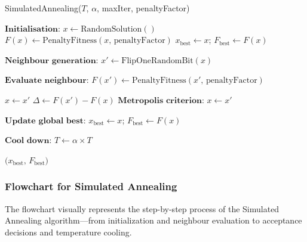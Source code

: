 \documentclass[12pt]{article}
\begin{document}
\begin{algorithm}[htbp]
  \caption{SimulatedAnnealing(\(T\), \(\alpha\), maxIter, penaltyFactor)}
  \label{alg:simulated_annealing}
  \begin{algorithmic}[1]
    \State \(\textbf{Initialisation:}\)
    \State \(x \gets \text{RandomSolution}()\) 
    \State \(F(x) \gets \text{PenaltyFitness}(x,\, \text{penaltyFactor})\) 
    \State \(x_{\text{best}} \gets x\); \quad \(F_{\text{best}} \gets F(x)\)

      \State \(\textbf{Neighbour generation:}\)
      \State \(x' \gets \text{FlipOneRandomBit}(x)\) 

      \State \(\textbf{Evaluate neighbour:}\)
      \State \(F(x') \gets \text{PenaltyFitness}(x',\, \text{penaltyFactor})\)

        \State \(x \gets x'\) 
      \Else
        \State \(\Delta \gets F(x') - F(x)\)
        \State \(\textbf{Metropolis criterion:}\)
          \State \(x \gets x'\) 
        \EndIf
      \EndIf

      \State \(\textbf{Update global best:}\)
        \State \(x_{\text{best}} \gets x\); \quad \(F_{\text{best}} \gets F(x)\)
      \EndIf

      \State \(\textbf{Cool down:}\)
      \State \(T \gets \alpha \times T\)
    \EndFor
    
    \State \Return \(\bigl(x_{\text{best}},\, F_{\text{best}}\bigr)\)
  \end{algorithmic}
\end{algorithm}

\subsubsection{Flowchart for Simulated Annealing}
The flowchart visually represents the step-by-step process of the Simulated Annealing algorithm—from initialization and neighbour evaluation to acceptance decisions and temperature cooling.
\end{document}
